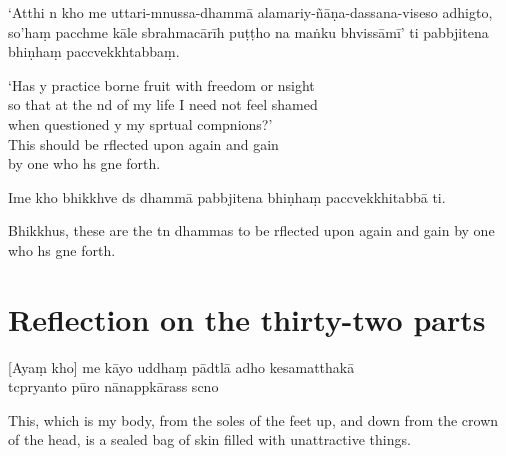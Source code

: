 `Atthi n kho me uttari-mnussa-dhammā alamariy-ñāṇa-dassana-viseso adhigto, so'haṃ pacchme kāle sbrahmacārīh puṭṭho na maṅku bhvissāmī' ti pabbjitena bhiṇhaṃ paccvekkhtabbaṃ.

\begin{english}
  `Has y practice borne fruit with freedom or nsight\\
  so that at the nd of my life I need not feel shamed\\
  when questioned y my sprtual compnions?'\\
  This should be rflected upon again and gain\\
  by one who hs gne forth.
\end{english}

Ime kho bhikkhve ds dhammā pabbjitena bhiṇhaṃ paccvekkhitabbā ti.

\begin{english}
  Bhikkhus, these are the tn dhammas to be rflected upon again and gain by one who hs gne forth.
\end{english}

\clearpage

\chapter[Thirty-two parts]{Reflection on the thirty-two parts}%

\begin{leader}
\end{leader}

[Ayaṃ kho] me kāyo uddhaṃ pādtlā adho kesamatthakā\\
tcpryanto pūro nānappkārass scno

\begin{english}
  This, which is my body, from the soles of the feet up, and down from the crown of the head, is a sealed bag of skin filled with unattractive things.
\end{english}


